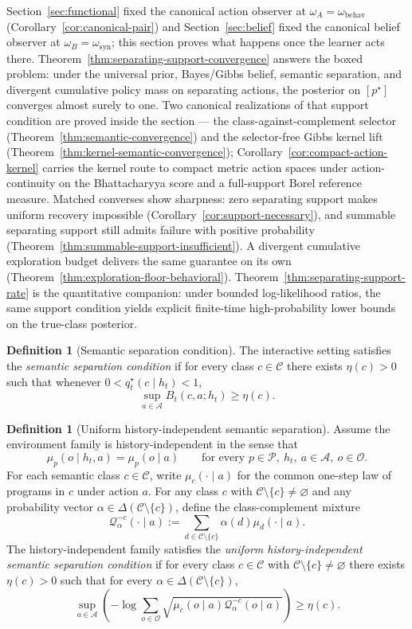 \documentclass[11pt]{article}
\theoremstyle{definition}
\newtheorem{definition}[theorem]{Definition}
\theoremstyle{remark}
\newcommand{\Acal}{\mathcal{A}}
\newcommand{\Ccal}{\mathcal{C}}
\newcommand{\Ocal}{\mathcal{O}}
\newcommand{\Pcal}{\mathcal{P}}
\newcommand{\Qcal}{\mathcal{Q}}
\begin{document}
Section~\ref{sec:functional} fixed the canonical action observer at $\omega_A=\omega_{\mathrm{behav}}$ (Corollary~\ref{cor:canonical-pair}) and Section~\ref{sec:belief} fixed the canonical belief observer at $\omega_B=\omega_{\mathrm{syn}}$; this section proves what happens once the learner acts there. Theorem~\ref{thm:separating-support-convergence} answers the boxed problem: under the universal prior, Bayes/Gibbs belief, semantic separation, and divergent cumulative policy mass on separating actions, the posterior on $[p^\star]$ converges almost surely to one. Two canonical realizations of that support condition are proved inside the section --- the class-against-complement selector (Theorem~\ref{thm:semantic-convergence}) and the selector-free Gibbs kernel lift (Theorem~\ref{thm:kernel-semantic-convergence}); Corollary~\ref{cor:compact-action-kernel} carries the kernel route to compact metric action spaces under action-continuity on the Bhattacharyya score and a full-support Borel reference measure. Matched converses show sharpness: zero separating support makes uniform recovery impossible (Corollary~\ref{cor:support-necessary}), and summable separating support still admits failure with positive probability (Theorem~\ref{thm:summable-support-insufficient}). A divergent cumulative exploration budget delivers the same guarantee on its own (Theorem~\ref{thm:exploration-floor-behavioral}). Theorem~\ref{thm:separating-support-rate} is the quantitative companion: under bounded log-likelihood ratios, the same support condition yields explicit finite-time high-probability lower bounds on the true-class posterior.

\begin{definition}[Semantic separation condition]
\label{def:sep-condition}
The interactive setting satisfies the \emph{semantic separation condition} if for every class $c\in\Ccal$ there exists $\eta(c)>0$ such that whenever $0<q_t^\star(c\mid h_t)<1$,
\[
\sup_{a\in\Acal}B_t(c,a;h_t)\ge \eta(c).
\]
\end{definition}

\begin{definition}[Uniform history-independent semantic separation]
\label{def:uniform-history-independent-separation}
Assume the environment family is history-independent in the sense that
\[
\mu_p(o\mid h_t,a)=\mu_p(o\mid a)
\qquad
\text{for every }p\in\Pcal,\ h_t,\ a\in\Acal,\ o\in\Ocal.
\]
For each semantic class $c\in\Ccal$, write $\mu_c(\cdot\mid a)$ for the common one-step law of programs in $c$ under action $a$. For any class $c$ with $\Ccal\setminus\{c\}\neq\varnothing$ and any probability vector $\alpha\in\Delta(\Ccal\setminus\{c\})$, define the class-complement mixture
\[
\Qcal_{\alpha}^{-c}(\cdot\mid a)
:=
\sum_{d\in\Ccal\setminus\{c\}}\alpha(d)\mu_d(\cdot\mid a).
\]
The history-independent family satisfies the \emph{uniform history-independent semantic separation condition} if for every class $c\in\Ccal$ with $\Ccal\setminus\{c\}\neq\varnothing$ there exists $\eta(c)>0$ such that for every $\alpha\in\Delta(\Ccal\setminus\{c\})$,
\[
\sup_{a\in\Acal}
\left(
-\log\sum_{o\in\Ocal}\sqrt{\mu_c(o\mid a)\Qcal_{\alpha}^{-c}(o\mid a)}
\right)
\ge \eta(c).
\]
\end{definition}
\end{document}
